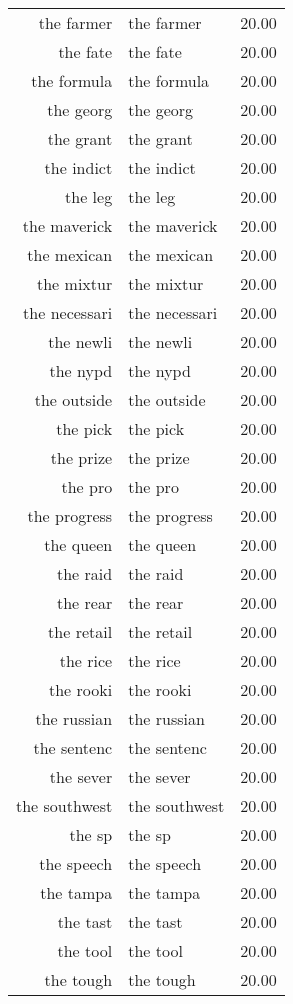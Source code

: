 \begin{table}[ht]
\begin{tabular}{rlr}
  the farmer & the farmer & 20.00 \\ 
  the fate & the fate & 20.00 \\ 
  the formula & the formula & 20.00 \\ 
  the georg & the georg & 20.00 \\ 
  the grant & the grant & 20.00 \\ 
  the indict & the indict & 20.00 \\ 
  the leg & the leg & 20.00 \\ 
  the maverick & the maverick & 20.00 \\ 
  the mexican & the mexican & 20.00 \\ 
  the mixtur & the mixtur & 20.00 \\ 
  the necessari & the necessari & 20.00 \\ 
  the newli & the newli & 20.00 \\ 
  the nypd & the nypd & 20.00 \\ 
  the outside & the outside & 20.00 \\ 
  the pick & the pick & 20.00 \\ 
  the prize & the prize & 20.00 \\ 
  the pro & the pro & 20.00 \\ 
  the progress & the progress & 20.00 \\ 
  the queen & the queen & 20.00 \\ 
  the raid & the raid & 20.00 \\ 
  the rear & the rear & 20.00 \\ 
  the retail & the retail & 20.00 \\ 
  the rice & the rice & 20.00 \\ 
  the rooki & the rooki & 20.00 \\ 
  the russian & the russian & 20.00 \\ 
  the sentenc & the sentenc & 20.00 \\ 
  the sever & the sever & 20.00 \\ 
  the southwest & the southwest & 20.00 \\ 
  the sp & the sp & 20.00 \\ 
  the speech & the speech & 20.00 \\ 
  the tampa & the tampa & 20.00 \\ 
  the tast & the tast & 20.00 \\ 
  the tool & the tool & 20.00 \\ 
  the tough & the tough & 20.00 \\ 

\end{tabular}
\end{table}
